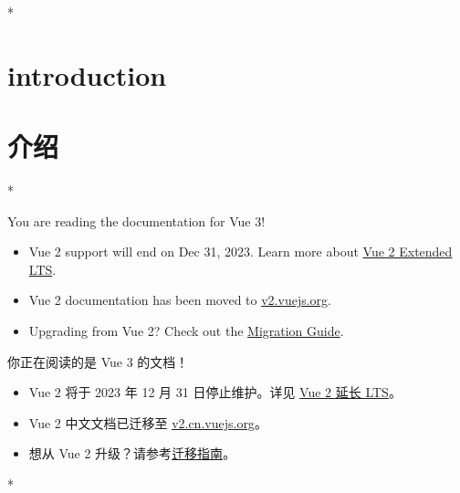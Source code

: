 



\begin{paracol}{2}
\switchcolumn[0]*%
\section{introduction}
\switchcolumn
\section{介绍}
\switchcolumn[0]*%
\begin{vueQuote}{You are reading the documentation for Vue 3!}
\begin{itemize}
    \item
      Vue 2 support will end on Dec 31, 2023. Learn more about
      \href{https://v2.vuejs.org/lts/}{Vue 2 Extended LTS}.
    \item
      Vue 2 documentation has been moved to
      \href{https://v2.vuejs.org/}{v2.vuejs.org}.
    \item
      Upgrading from Vue 2? Check out the
      \href{https://v3-migration.vuejs.org/}{Migration Guide}.
    \end{itemize}
\end{vueQuote}
\switchcolumn
\begin{vueQuote}{你正在阅读的是 Vue 3 的文档！}
\begin{itemize}
\item
    Vue 2 将于 2023 年 12 月 31 日停止维护。详见
    \href{https://v2.vuejs.org/lts/}{Vue 2 延长 LTS}。
\item
    Vue 2 中文文档已迁移至
    \href{https://v2.cn.vuejs.org/}{v2.cn.vuejs.org}。
\item
    想从 Vue 2
    升级？请参考\href{https://v3-migration.vuejs.org/}{迁移指南}。
\end{itemize}
\end{vueQuote}
\switchcolumn[0]*%

\end{paracol}
